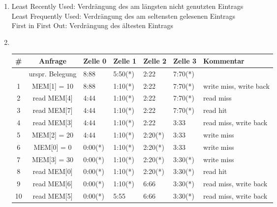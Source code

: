 \documentclass[10pt,a4paper]{article}
\begin{document}
\begin{enumerate}
		\item Least Recently Used: Verdrängung des am längsten nicht genutzten Eintrags \\
					Least Frequently Used: Verdrängung des am seltensten gelesenen Eintrags \\
					First in First Out: Verdrängung des ältesten Eintrags
		\item \text{}\\
			\begin{tabular}{cc|lllll}
				\# & Anfrage         & Zelle 0 & Zelle 1 & Zelle 2 & Zelle 3 & Kommentar              \\ \hline
				   & urspr. Belegung & 8:88    & 5:50(*) & 2:22    & 7:70(*) &                        \\
				 1 & MEM[1] = 10     & 8:88    & 1:10(*) & 2:22    & 7:70(*) & write miss, write back \\
				 2 & read MEM[4]     & 4:44    & 1:10(*) & 2:22    & 7:70(*) & read miss              \\
				 3 & read MEM[7]     & 4:44    & 1:10(*) & 2:22    & 7:70(*) & read hit                       \\ 
				 4 & read MEM[3]     & 4:44    & 1:10(*) & 2:22    & 3:33    & read miss, write back  \\ 
				 5 & MEM[2] = 20     & 4:44    & 1:10(*) & 2:20(*) & 3:33    & write miss             \\
				 6 & MEM[0] = 0      & 0:00(*) & 1:10(*) & 2:20(*) & 3:33    & write miss             \\ 
				 7 & MEM[3] = 30     & 0:00(*) & 1:10(*) & 2:20(*) & 3:30(*) & write miss             \\ 
				 8 & read MEM[0]     & 0:00(*) & 1:10(*) & 2:20(*) & 3:30(*) & read hit               \\ 
				 9 & read MEM[6]     & 0:00(*) & 1:10(*) & 6:66    & 3:30(*) & read miss, write back  \\ 
				10 & read MEM[5]     & 0:00(*) & 5:55    & 6:66    & 3:30(*) & read miss, write back  \\ 
			\end{tabular}
	\end{enumerate}
			
\end{document}
